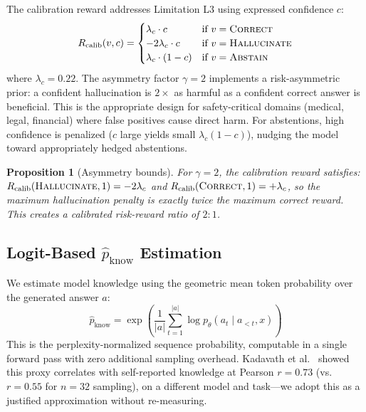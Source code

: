 \documentclass[11pt]{article}
\newtheorem{proposition}{Proposition}
\begin{document}
The calibration reward addresses Limitation L3 using expressed confidence $c$:
\begin{equation}
R_{\text{calib}}(v, c) = \begin{cases}
\lambda_c \cdot c & \text{if } v = \textsc{Correct} \\
-2\lambda_c \cdot c & \text{if } v = \textsc{Hallucinate} \\
\lambda_c \cdot (1 - c) & \text{if } v = \textsc{Abstain}
\end{cases}
\label{eq:calib}
\end{equation}
where $\lambda_c = 0.22$. The asymmetry factor $\gamma = 2$ implements a risk-asymmetric prior: a confident hallucination is $2\times$ as harmful as a confident correct answer is beneficial. This is the appropriate design for safety-critical domains (medical, legal, financial) where false positives cause direct harm. For abstentions, high confidence is penalized ($c$ large yields small $\lambda_c(1-c)$), nudging the model toward appropriately hedged abstentions.

\begin{proposition}[Asymmetry bounds]
For $\gamma = 2$, the calibration reward satisfies: $R_{\text{calib}}(\textsc{Hallucinate}, 1) = -2\lambda_c$ and $R_{\text{calib}}(\textsc{Correct}, 1) = +\lambda_c$, so the maximum hallucination penalty is exactly twice the maximum correct reward. This creates a calibrated risk-reward ratio of $2:1$.
\end{proposition}

\subsection{Logit-Based $\hat{p}_{\text{know}}$ Estimation}
\label{sec:pknow}

We estimate model knowledge using the geometric mean token probability over the generated answer $a$:
\begin{equation}
\hat{p}_{\text{know}} = \exp\!\left(\frac{1}{|a|}\sum_{t=1}^{|a|} \log p_\theta(a_t \mid a_{<t}, x)\right)
\label{eq:pknow}
\end{equation}
This is the perplexity-normalized sequence probability, computable in a single forward pass with zero additional sampling overhead. Kadavath et al.~\cite{kadavath2022language} showed this proxy correlates with self-reported knowledge at Pearson $r=0.73$ (vs.\ $r=0.55$ for $n=32$ sampling), on a different model and task---we adopt this as a justified approximation without re-measuring.
\end{document}
